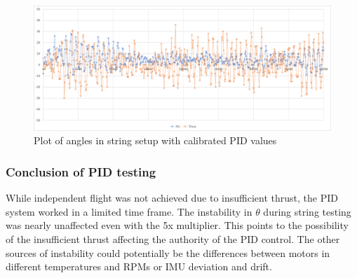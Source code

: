 \begin{figure}[h]
    \centering
    \includegraphics[width=\textwidth]{pictures/graphs/ZN10P5DT4The5.png}
    \caption{Plot of angles in string setup with calibrated PID values}
    \label{fig:ZN10P}
\end{figure}

\subsubsection{Conclusion of PID testing}

While independent flight was not achieved due to insufficient thrust, the PID system worked in a limited time frame. The instability in $\theta$ during string testing was nearly unaffected even with the 5x multiplier. This points to the possibility of the insufficient thrust affecting the authority of the PID control.
The other sources of instability could potentially be the differences between motors in different temperatures and RPMs or IMU deviation and drift.
